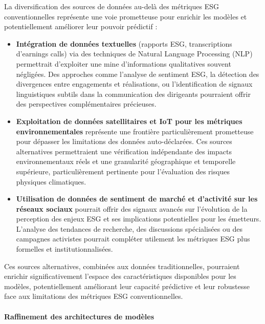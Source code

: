 La diversification des sources de données au-delà des métriques ESG conventionnelles représente une voie prometteuse pour enrichir les modèles et potentiellement améliorer leur pouvoir prédictif :
\begin{itemize}
    \item \textbf{Intégration de données textuelles} (rapports ESG, transcriptions d'earnings calls) via des techniques de Natural Language Processing (NLP) permettrait d'exploiter une mine d'informations qualitatives souvent négligées. Des approches comme l'analyse de sentiment ESG, la détection des divergences entre engagements et réalisations, ou l'identification de signaux linguistiques subtils dans la communication des dirigeants pourraient offrir des perspectives complémentaires précieuses.
    
    \item \textbf{Exploitation de données satellitaires et IoT pour les métriques environnementales} représente une frontière particulièrement prometteuse pour dépasser les limitations des données auto-déclarées. Ces sources alternatives permettraient une vérification indépendante des impacts environnementaux réels et une granularité géographique et temporelle supérieure, particulièrement pertinente pour l'évaluation des risques physiques climatiques.
    
    \item \textbf{Utilisation de données de sentiment de marché et d'activité sur les réseaux sociaux} pourrait offrir des signaux avancés sur l'évolution de la perception des enjeux ESG et ses implications potentielles pour les émetteurs. L'analyse des tendances de recherche, des discussions spécialisées ou des campagnes activistes pourrait compléter utilement les métriques ESG plus formelles et institutionnalisées.
\end{itemize}

Ces sources alternatives, combinées aux données traditionnelles, pourraient enrichir significativement l'espace des caractéristiques disponibles pour les modèles, potentiellement améliorant leur capacité prédictive et leur robustesse face aux limitations des métriques ESG conventionnelles.

\paragraph{Raffinement des architectures de modèles} 

